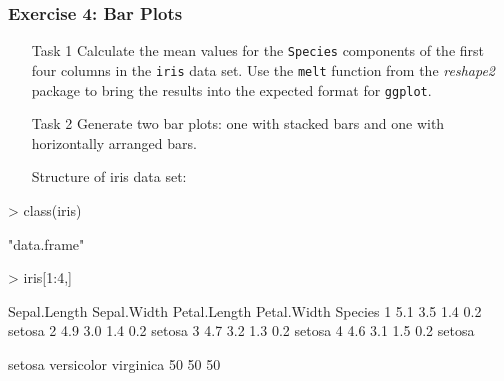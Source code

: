 \documentclass{beamer}
\newcommand{\Rfunction}[1]{{\texttt{#1}}}
\newcommand{\Rpackage}[1]{{\textit{#1}}}
\begin{document}
\begin{frame}[containsverbatim]  
	\frametitle{Exercise 4: Bar Plots}
\scriptsize
\begin{itemize}
        \item[Task 1] Calculate the mean values for the \Rfunction{Species} components of the first four columns in the \Rfunction{iris} data set. Use the \Rfunction{melt} function from the \Rpackage{reshape2} package to bring the results into the expected format for \Rfunction{ggplot}.
        \item[Task 2] Generate two bar plots: one with stacked bars and one with horizontally arranged bars. 
        \item[]\hspace{-1.1cm} Structure of iris data set:
\end{itemize}
\begin{Schunk}
\begin{Sinput}
> class(iris)
\end{Sinput}
\begin{Soutput}
[1] "data.frame"
\end{Soutput}
\begin{Sinput}
> iris[1:4,]
\end{Sinput}
\begin{Soutput}
  Sepal.Length Sepal.Width Petal.Length Petal.Width Species
1          5.1         3.5          1.4         0.2  setosa
2          4.9         3.0          1.4         0.2  setosa
3          4.7         3.2          1.3         0.2  setosa
4          4.6         3.1          1.5         0.2  setosa
\end{Soutput}
\begin{Soutput}
    setosa versicolor  virginica 
        50         50         50 
\end{Soutput}
\end{Schunk}
\end{frame}
\end{document}
